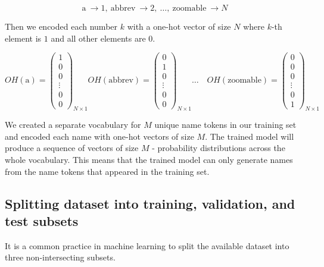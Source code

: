\[
\text{a}\ \rightarrow 1,\ \text{abbrev}\ \rightarrow 2,\ \dots,\ \text{zoomable}\ \rightarrow N
\]

Then we encoded each number $k$ with a one-hot vector of size $N$ where $k$-th element is $1$ and all other elements are $0$.

\[
    OH(\text{a}) =
    \begin{pmatrix}
        1 \\ 0 \\ 0 \\ \vdots \\ 0 \\ 0
    \end{pmatrix}_{N \times 1}
    OH(\text{abbrev}) =
    \begin{pmatrix}
        0 \\ 1 \\ 0 \\ \vdots \\ 0 \\ 0
    \end{pmatrix}_{N \times 1}\dots\quad
    OH(\text{zoomable}) =
    \begin{pmatrix}
        0 \\ 0 \\ 0 \\ \vdots \\ 0 \\ 1
    \end{pmatrix}_{N \times 1}
\]

We created a separate vocabulary for $M$ unique name tokens in our training set and encoded each name with one-hot vectors of size $M$. The trained model will produce a sequence of vectors of size $M$ - probability distributions across the whole vocabulary. This means that the trained model can only generate names from the name tokens that appeared in the training set.

\subsection{Splitting dataset into training, validation, and test subsets}
\label{sec:TranslatingCode-TrainValidTest}

It is a common practice in machine learning to split the available dataset into three non-intersecting subsets.

